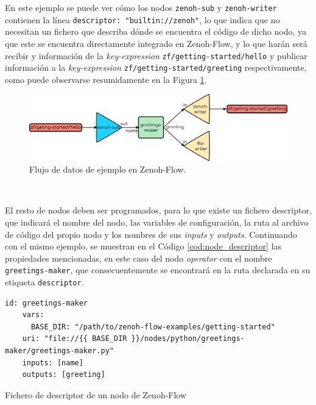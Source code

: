 En este ejemplo se puede ver cómo los nodos \verb|zenoh-sub| y
\verb|zenoh-writer| contienen la línea \verb|descriptor: "builtin://zenoh"|, lo
que indica que no necesitan un fichero que describa dónde se encuentra el código
de dicho nodo, ya que este se encuentra directamente integrado en Zenoh-Flow, y
lo que harán será recibir y información de la \textit{key-expression}
\verb|zf/getting-started/hello| y publicar información a la
\textit{key-expression} \verb|zf/getting-started/greeting| respectivamente, como
puede observarse resumidamente en la Figura \ref{fig:zf_example}.
\\

\begin{figure} [h!]
  \begin{center}
    \includegraphics[width=15cm]{figs/zenoh_flow_example}
  \end{center}
  \caption{Flujo de datos de ejemplo en Zenoh-Flow.}
  \label{fig:zf_example}
\end{figure}\

El resto de nodos deben ser programados, para lo que existe un fichero
descriptor, que indicará el nombre del nodo, las variables de configuración, la
ruta al archivo de código del propio nodo y los nombres de sus \textit{inputs} y
\textit{outputs}.
Continuando con el mismo ejemplo, se muestran en el Código
\ref{cod:node_descriptor} las propiedades mencionadas, en este caso del nodo
\textit{operator} con el nombre \verb|greetings-maker|, que consecuentemente se
encontrará en la ruta declarada en su etiqueta \verb|descriptor|.
\\

\begin{code}[h!]
  \begin{lstlisting}[style=yaml]
    id: greetings-maker
    vars:
      BASE_DIR: "/path/to/zenoh-flow-examples/getting-started"
    uri: "file://{{ BASE_DIR }}/nodes/python/greetings-maker/greetings-maker.py"
    inputs: [name]
    outputs: [greeting]
  \end{lstlisting}
\caption[Fichero de descriptor de un nodo de Zenoh-Flow]{Fichero de descriptor de un nodo de Zenoh-Flow}
\label{cod:node_descriptor}
\end{code}

